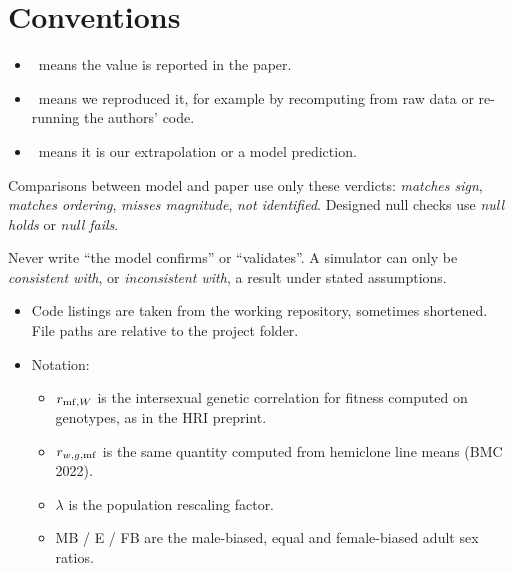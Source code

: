 \section{Conventions}
\begin{keybox}
\begin{itemize}
\item \claimA\ means the value is reported in the paper.
\item \claimB\ means we reproduced it, for example by recomputing from raw data or re-running the authors' code.
\item \claimC\ means it is our extrapolation or a model prediction.
\end{itemize}
Comparisons between model and paper use only these verdicts: \emph{matches sign}, \emph{matches ordering}, \emph{misses magnitude}, \emph{not identified}. Designed null checks use \emph{null holds} or \emph{null fails}.

Never write ``the model confirms'' or ``validates''. A simulator can only be \emph{consistent with}, or \emph{inconsistent with}, a result under stated assumptions.
\end{keybox}
\begin{itemize}
\item Code listings are taken from the working repository, sometimes shortened. File paths are relative to the project folder.
\item Notation:
  \begin{itemize}
  \item $r_{\mathrm{mf},W}$ is the intersexual genetic correlation for fitness computed on genotypes, as in the HRI preprint.
  \item $r_{w,g,\mathrm{mf}}$ is the same quantity computed from hemiclone line means (BMC 2022).
  \item $\lambda$ is the population rescaling factor.
  \item MB / E / FB are the male-biased, equal and female-biased adult sex ratios.
  \end{itemize}
\end{itemize}

